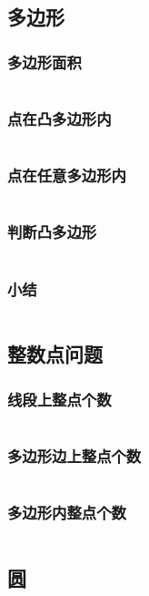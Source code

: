   \subsection{多边形}
    \subsubsection{多边形面积}
      \inputminted{cpp}{src/6_计算几何/3_多边形/1_多边形面积.cpp}
    \subsubsection{点在凸多边形内}
      \inputminted{cpp}{src/6_计算几何/3_多边形/2_点在凸多边形内.cpp}
    \subsubsection{点在任意多边形内}
      \inputminted{cpp}{src/6_计算几何/3_多边形/3_点在任意多边形内.cpp}
    \subsubsection{判断凸多边形}
      \inputminted{cpp}{src/6_计算几何/3_多边形/4_判断凸多边形.cpp}
    \subsubsection{小结}
      \inputminted{cpp}{src/6_计算几何/3_多边形/5_小结.cpp}
  \subsection{整数点问题}
    \subsubsection{线段上整点个数}
      \inputminted{cpp}{src/6_计算几何/4_整数点问题/1_线段上整点个数.cpp}
    \subsubsection{多边形边上整点个数}
      \inputminted{cpp}{src/6_计算几何/4_整数点问题/2_多边形边上整点个数.cpp}
    \subsubsection{多边形内整点个数}
      \inputminted{cpp}{src/6_计算几何/4_整数点问题/3_多边形内整点个数.cpp}
  \subsection{圆}
    \inputminted{cpp}{src/6_计算几何/5_圆/1_过三点求圆心.cpp}
